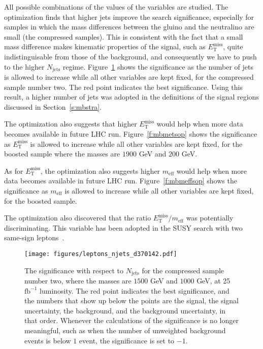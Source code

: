 All possible combinations of the values of the variables are studied. The
optimization finds that higher jets improve the search significance, especially
for samples in which the mass differences between the gluino and the neutralino
are small (the compressed samples). This is consistent with the fact that a
small mass difference makes kinematic properties of the signal, such as
$E_{\text{T}}^{\text{miss}}$, quite indistinguisable from those of the
background, and consequently we have to push to the higher $N_{\text{jets}}$
regime. Figure~\ref{f:mbnjetsop} shows the significance as the number of jets
is allowed to increase while all other variables are kept fixed, for the
compressed sample number two. The red point indicates the best significance.
Using this result, a higher number of jets was adopted in the definitions of
the signal regions discussed in Section~\ref{s:mbstra}.


The optimization also suggests that higher $E_{\text{T}}^{\text{miss}}$ would
help when more data becomes available in future LHC run.
Figure~\ref{f:mbmetsop} shows the significance as $E_{\text{T}}^{\text{miss}}$
is allowed to increase while all other variables are kept fixed, for the
boosted sample where the masses are $1900$ GeV and $200$ GeV.

As for $E_{\text{T}}^{\text{miss}}$, the optimization also suggests higher
$m_{\text{eff}}$ would help when more data becomes available in future LHC run.
Figure~\ref{f:mbmeffsop} shows the significance as $m_{\text{eff}}$ is allowed
to increase while all other variables are kept fixed, for the boosted sample.

The optimization also discovered that the ratio $E_{\text{T}}^{\text{miss}}
/m_{\text{eff}}$ was potentially discriminating. This variable has been adopted
in the SUSY search with two same-sign leptons~\cite{ssssleptons}.


\begin{figure}[H]
	\texttt{[image: figures/leptons\_njets\_d370142.pdf]}
	\centering

	\caption{The significance with respect to $N_{\text{jets}}$ for the compressed
		sample number two, where the masses are $1500$ GeV and $1000$ GeV, at 25
		$\text{fb}^{-1}$ luminosity. The red point indicates the best significance, and
		the numbers that show up below the points are the signal, the signal
		uncertainty, the background, and the background uncertainty, in that order.
		Whenever the calculations of the significance is no longer meaningful, such as
		when the number of unweighted background events is below $1$ event, the
		significance is set to $-1$.}

	\label{f:mbnjetsop}
\end{figure}


